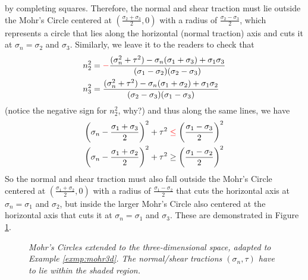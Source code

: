 by completing squares. Therefore, the normal and shear traction must lie outside the Mohr's Circle centered at $(\frac{\sigma_2 + \sigma_3}{2},0)$ with a radius of $\frac{\sigma_2 - \sigma_3}{2}$, which represents a circle that lies along the horizontal (normal traction) axis and cuts it at $\sigma_n = \sigma_2$ and $\sigma_3$. Similarly, we leave it to the readers to check that
\begin{align}
n_2^2 &= \mathcolor{red}{-}\frac{(\sigma_n^2 + \tau^2) - \sigma_n(\sigma_1 + \sigma_3) + \sigma_1\sigma_3}{(\sigma_1 - \sigma_2)(\sigma_2-\sigma_3)} \\
n_3^2 &= \frac{(\sigma_n^2 + \tau^2) - \sigma_n(\sigma_1 + \sigma_2) + \sigma_1\sigma_2}{(\sigma_2 - \sigma_3)(\sigma_1-\sigma_3)}
\end{align}
(notice the negative sign for $n_2^2$, why?) and thus along the same lines, we have
\begin{align}
\left(\sigma_n-\frac{\sigma_1 + \sigma_3}{2}\right)^2 + \tau^2 &\mathcolor{red}{\leq} \left(\frac{\sigma_1 - \sigma_3}{2}\right)^2 \\
\left(\sigma_n-\frac{\sigma_1 + \sigma_2}{2}\right)^2 + \tau^2 &\geq \left(\frac{\sigma_1 - \sigma_2}{2}\right)^2
\end{align}
So the normal and shear traction must also fall outside the Mohr's Circle centered at $(\frac{\sigma_1 + \sigma_2}{2},0)$ with a radius of $\frac{\sigma_1 - \sigma_2}{2}$ that cuts the horizontal axis at $\sigma_n = \sigma_1$ and $\sigma_2$, but inside the larger Mohr's Circle also centered at the horizontal axis that cuts it at $\sigma_n = \sigma_1$ and $\sigma_3$. These are demonstrated in Figure \ref{fig:mohr3d}.

\begin{figure}[t!]
    \centering
    \caption{\textit{Mohr's Circles extended to the three-dimensional space, adapted to Example \ref{exmp:mohr3d}. The normal/shear tractions $(\sigma_n, \tau)$ have to lie within the shaded region.}}
    \label{fig:mohr3d}
\end{figure}


